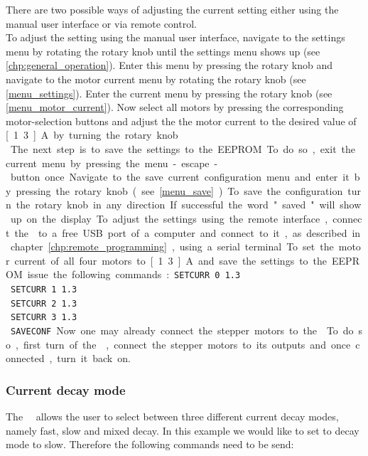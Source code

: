 There are two possible ways of adjusting the current setting either using the manual user interface or via remote control.\\
To adjust the setting using the manual user interface, navigate to the settings menu by rotating the rotary knob until the settings menu shows up (see \ref{chp:general_operation}). Enter this menu by pressing the rotary knob and navigate to the motor current menu by rotating the rotary knob (see \ref{menu_settings}). Enter the current menu by pressing the rotary knob (see \ref{menu_motor_current}). Now select all motors by pressing the corresponding motor-selection buttons and adjust the the motor current to the desired value of \unit[1.3]{A} by turning the rotary knob.\\
The next step is to save the settings to the EEPROM. To do so, exit the current menu by pressing the menu-escape-button once. Navigate to the save current configuration menu and enter it by pressing the rotary knob (see \ref{menu_save}). To save the configuration turn the rotary knob in any direction. If successful the word "saved" will show up on the display.

To adjust the settings using the remote interface, connect the \productName ~to a free USB port of a computer and connect to it, as described in chapter \ref{chp:remote_programming}, using a serial terminal. To set the motor current of all four motors to \unit[1.3]{A} and save the settings to the EEPROM issue the following commands:

\texttt{SETCURR 0 1.3}\\
\texttt{SETCURR 1 1.3}\\
\texttt{SETCURR 2 1.3}\\
\texttt{SETCURR 3 1.3}\\
\texttt{SAVECONF}

Now one may already connect the stepper motors to the \productName . To do so, first turn of the \productName , connect the stepper motors to its outputs and once connected, turn it back on.

\subsubsection{Current decay mode}
The \productNumber ~\productName ~allows the user to select between three different current decay modes, namely fast, slow and mixed decay. In this example we would like to set to decay mode to slow. Therefore the following commands need to be send:

